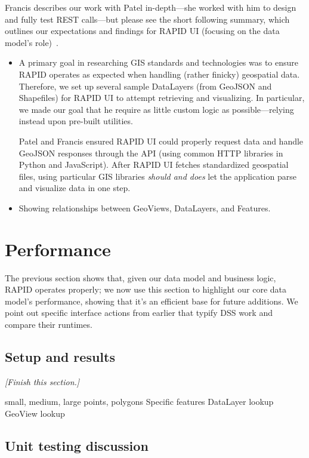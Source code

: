 Francis describes our work with Patel in-depth---she worked with him to design and fully test REST calls---but please see the short following summary, which outlines our expectations and findings for RAPID UI (focusing on the data model's role)~\cite{Francis}.

\begin{itemize}
\item A primary goal in researching GIS standards and technologies was to ensure RAPID operates as expected when handling (rather finicky) geospatial data. Therefore, we set up several sample DataLayers (from GeoJSON and Shapefiles) for RAPID UI to attempt retrieving and visualizing. In particular, we made our goal that he require as little custom logic as possible---relying instead upon pre-built utilities.

Patel and Francis ensured RAPID UI could properly request data and handle GeoJSON responses through the API (using common HTTP libraries in Python and JavaScript). After RAPID UI fetches standardized geospatial files, using particular GIS libraries \textit{should and does} let the application parse and visualize data in one step.

\item Showing relationships between GeoViews, DataLayers, and Features.

\end{itemize}

\section{Performance}
The previous section shows that, given our data model and business logic, RAPID operates properly; we now use this section to highlight our core data model's performance, showing that it's an efficient base for future additions. We point out specific interface actions from earlier that typify DSS work and compare their runtimes.

\subsection{Setup and results}
\textit{[Finish this section.]}

small, medium, large
points, polygons
Specific features
DataLayer lookup
GeoView lookup


\subsection{Unit testing discussion}

